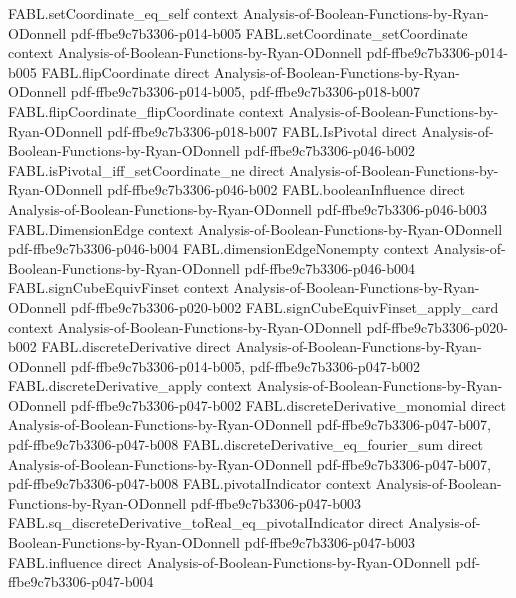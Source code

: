 \begin{theorem}
\proofstep
  {FABL.setCoordinate_eq_self}
  {context}
  {Analysis-of-Boolean-Functions-by-Ryan-ODonnell}
  {pdf-ffbe9c7b3306-p014-b005}
\proofstep
  {FABL.setCoordinate_setCoordinate}
  {context}
  {Analysis-of-Boolean-Functions-by-Ryan-ODonnell}
  {pdf-ffbe9c7b3306-p014-b005}
\proofstep
  {FABL.flipCoordinate}
  {direct}
  {Analysis-of-Boolean-Functions-by-Ryan-ODonnell}
  {pdf-ffbe9c7b3306-p014-b005,
    pdf-ffbe9c7b3306-p018-b007}
\proofstep
  {FABL.flipCoordinate_flipCoordinate}
  {context}
  {Analysis-of-Boolean-Functions-by-Ryan-ODonnell}
  {pdf-ffbe9c7b3306-p018-b007}
\proofstep
  {FABL.IsPivotal}
  {direct}
  {Analysis-of-Boolean-Functions-by-Ryan-ODonnell}
  {pdf-ffbe9c7b3306-p046-b002}
\proofstep
  {FABL.isPivotal_iff_setCoordinate_ne}
  {direct}
  {Analysis-of-Boolean-Functions-by-Ryan-ODonnell}
  {pdf-ffbe9c7b3306-p046-b002}
\proofstep
  {FABL.booleanInfluence}
  {direct}
  {Analysis-of-Boolean-Functions-by-Ryan-ODonnell}
  {pdf-ffbe9c7b3306-p046-b003}
\proofstep
  {FABL.DimensionEdge}
  {context}
  {Analysis-of-Boolean-Functions-by-Ryan-ODonnell}
  {pdf-ffbe9c7b3306-p046-b004}
\proofstep
  {FABL.dimensionEdgeNonempty}
  {context}
  {Analysis-of-Boolean-Functions-by-Ryan-ODonnell}
  {pdf-ffbe9c7b3306-p046-b004}
\proofstep
  {FABL.signCubeEquivFinset}
  {context}
  {Analysis-of-Boolean-Functions-by-Ryan-ODonnell}
  {pdf-ffbe9c7b3306-p020-b002}
\proofstep
  {FABL.signCubeEquivFinset_apply_card}
  {context}
  {Analysis-of-Boolean-Functions-by-Ryan-ODonnell}
  {pdf-ffbe9c7b3306-p020-b002}
\proofstep
  {FABL.discreteDerivative}
  {direct}
  {Analysis-of-Boolean-Functions-by-Ryan-ODonnell}
  {pdf-ffbe9c7b3306-p014-b005,
    pdf-ffbe9c7b3306-p047-b002}
\proofstep
  {FABL.discreteDerivative_apply}
  {context}
  {Analysis-of-Boolean-Functions-by-Ryan-ODonnell}
  {pdf-ffbe9c7b3306-p047-b002}
\proofstep
  {FABL.discreteDerivative_monomial}
  {direct}
  {Analysis-of-Boolean-Functions-by-Ryan-ODonnell}
  {pdf-ffbe9c7b3306-p047-b007,
    pdf-ffbe9c7b3306-p047-b008}
\proofstep
  {FABL.discreteDerivative_eq_fourier_sum}
  {direct}
  {Analysis-of-Boolean-Functions-by-Ryan-ODonnell}
  {pdf-ffbe9c7b3306-p047-b007,
    pdf-ffbe9c7b3306-p047-b008}
\proofstep
  {FABL.pivotalIndicator}
  {context}
  {Analysis-of-Boolean-Functions-by-Ryan-ODonnell}
  {pdf-ffbe9c7b3306-p047-b003}
\proofstep
  {FABL.sq_discreteDerivative_toReal_eq_pivotalIndicator}
  {direct}
  {Analysis-of-Boolean-Functions-by-Ryan-ODonnell}
  {pdf-ffbe9c7b3306-p047-b003}
\proofstep
  {FABL.influence}
  {direct}
  {Analysis-of-Boolean-Functions-by-Ryan-ODonnell}
  {pdf-ffbe9c7b3306-p047-b004}
\proofstep

\end{theorem}
